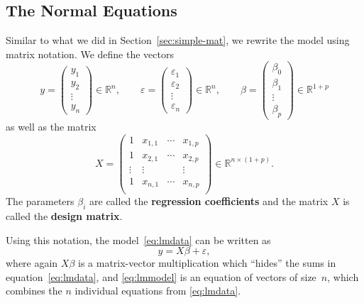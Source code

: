 \documentclass[
  a4paper,
]{article}
\theoremstyle{definition}
\theoremstyle{definition}
\theoremstyle{definition}
\theoremstyle{definition}
\theoremstyle{remark}
\begin{document}
\subsection{The Normal Equations}\label{the-normal-equations}

Similar to what we did in Section~\ref{sec:simple-mat}, we rewrite
the model using matrix notation. We define the vectors
\begin{equation*}
  y = \begin{pmatrix}
    y_1 \\ y_2 \\ \vdots \\ y_n
  \end{pmatrix}
  \in \mathbb{R}^n,
  \qquad
  \varepsilon= \begin{pmatrix}
    \varepsilon_1 \\ \varepsilon_2 \\ \vdots \\ \varepsilon_n
  \end{pmatrix}
  \in \mathbb{R}^n,
  \qquad
  \beta = \begin{pmatrix}
    \beta_0 \\
    \beta_1 \\
    \vdots \\
    \beta_p
  \end{pmatrix}
  \in\mathbb{R}^{1+p}
\end{equation*}
as well as the matrix
\begin{equation*}
  X = \begin{pmatrix}
    1 & x_{1,1} & \cdots & x_{1,p} \\
    1 & x_{2,1} & \cdots & x_{2,p} \\
    \vdots & \vdots & & \vdots \\
    1 & x_{n,1} & \cdots & x_{n,p} \\
  \end{pmatrix}
  \in \mathbb{R}^{n\times (1+p)}.
\end{equation*}
The parameters \(\beta_i\) are called the \textbf{regression coefficients} and
the matrix \(X\) is called the \textbf{design matrix}.

Using this notation, the model~\eqref{eq:lmdata} can be written
as
\begin{equation}
  y = X \beta + \varepsilon,  \label{eq:lmmodel}
\end{equation}
where again \(X\beta\) is a matrix-vector multiplication which ``hides''
the sums in equation~\eqref{eq:lmdata}, and \eqref{eq:lmmodel}
is an equation of vectors of size~\(n\), which combines the \(n\)
individual equations from \eqref{eq:lmdata}.
\end{document}
